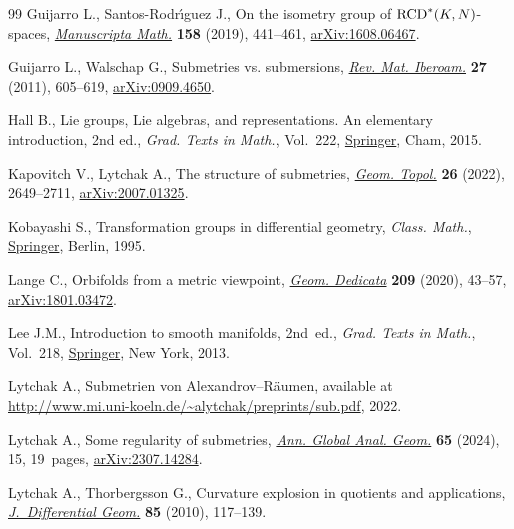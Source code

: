 \documentclass[10pt,a4paper]{amsart}
\numberwithin{equation}{section}
\theoremstyle{definition}
\begin{document}
\begin{thebibliography}{99}
Guijarro L., Santos-Rodr\'{\i}guez J., On the isometry group of {${\rm
 RCD}^*(K,N)$}-spaces,
 \href{https://doi.org/10.1007/s00229-018-1010-7}{\textit{Manuscripta Math.}}
 \textbf{158} (2019), 441--461,
 \href{http://arxiv.org/abs/1608.06467}{arXiv:1608.06467}.

Guijarro L., Walschap G., Submetries vs. submersions,
 \href{https://doi.org/10.4171/RMI/648}{\textit{Rev. Mat. Iberoam.}}
 \textbf{27} (2011), 605--619,
 \href{http://arxiv.org/abs/0909.4650}{arXiv:0909.4650}.

Hall B., Lie groups, {L}ie algebras, and representations. An elementary
 introduction, 2nd ed., \textit{Grad. Texts in Math.}, Vol.~222,
 \href{https://doi.org/10.1007/978-3-319-13467-3}{Springer}, Cham, 2015.

Kapovitch V., Lytchak A., The structure of submetries,
 \href{https://doi.org/10.2140/gt.2022.26.2649}{\textit{Geom. Topol.}}
 \textbf{26} (2022), 2649--2711,
 \href{http://arxiv.org/abs/2007.01325}{arXiv:2007.01325}.

Kobayashi S., Transformation groups in differential geometry, \textit{Class. Math.},
 \href{https://doi.org/10.1007/978-3-642-61981-6}{Springer}, Berlin, 1995.

Lange C., Orbifolds from a metric viewpoint,
 \href{https://doi.org/10.1007/s10711-020-00521-x}{\textit{Geom. Dedicata}}
 \textbf{209} (2020), 43--57,
 \href{http://arxiv.org/abs/1801.03472}{arXiv:1801.03472}.

Lee J.M., Introduction to smooth manifolds, 2nd~ed., \textit{Grad. Texts in Math.}, Vol.~218, \href{https://doi.org/10.1007/978-1-4419-9982-5}{Springer}, New
 York, 2013.

Lytchak A., Submetrien von {A}lexandrov--{R}\"aumen, available at
 \url{http://www.mi.uni-koeln.de/~alytchak/preprints/sub.pdf}, 2022.

Lytchak A., Some regularity of submetries,
 \href{https://doi.org/10.1007/s10455-024-09946-z}{\textit{Ann. Global Anal.
 Geom.}} \textbf{65} (2024), 15, 19~pages,
 \href{http://arxiv.org/abs/2307.14284}{arXiv:2307.14284}.

Lytchak A., Thorbergsson G., Curvature explosion in quotients and applications,
 \href{https://doi.org/10.4310/jdg/1284557927}{\textit{J.~Differential Geom.}}
 \textbf{85} (2010), 117--139.


\end{thebibliography}
\end{document}
